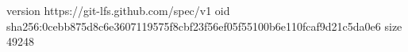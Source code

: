 version https://git-lfs.github.com/spec/v1
oid sha256:0cebb875d8c6e3607119575f8cbf23f56ef05f55100b6e110fcaf9d21c5da0e6
size 49248
